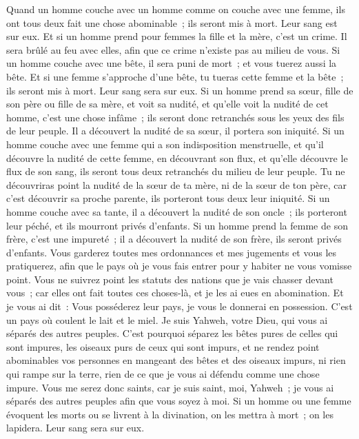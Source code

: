 \begin{multicols}{2}
Quand un homme couche avec un homme comme on couche avec une femme, ils ont tous deux fait une chose abominable~; ils seront mis à mort. Leur sang est sur eux.
Et si un homme prend pour femmes la fille et la mère, c'est un crime. Il sera brûlé au feu avec elles, afin que ce crime n'existe pas au milieu de vous.
Si un homme couche avec une bête, il sera puni de mort~; et vous tuerez aussi la bête.
Et si une femme s'approche d'une bête, tu tueras cette femme et la bête~; ils seront mis à mort. Leur sang sera sur eux.
Si un homme prend sa sœur, fille de son père ou fille de sa mère, et voit sa nudité, et qu'elle voit la nudité de cet homme, c'est une chose infâme~; ils seront donc retranchés sous les yeux des fils de leur peuple. Il a découvert la nudité de sa sœur, il portera son iniquité.
Si un homme couche avec une femme qui a son indisposition menstruelle, et qu'il découvre la nudité de cette femme, en découvrant son flux, et qu'elle découvre le flux de son sang, ils seront tous deux retranchés du milieu de leur peuple.
Tu ne découvriras point la nudité de la sœur de ta mère, ni de la sœur de ton père, car c'est découvrir sa proche parente, ils porteront tous deux leur iniquité.
Si un homme couche avec sa tante, il a découvert la nudité de son oncle~; ils porteront leur péché, et ils mourront privés d'enfants.
Si un homme prend la femme de son frère, c'est une impureté~; il a découvert la nudité de son frère, ils seront privés d'enfants.
Vous garderez toutes mes ordonnances et mes jugements et vous les pratiquerez, afin que le pays où je vous fais entrer pour y habiter ne vous vomisse point.
Vous ne suivrez point les statuts des nations que je vais chasser devant vous~; car elles ont fait toutes ces choses-là, et je les ai eues en abomination.
Et je vous ai dit~: Vous posséderez leur pays, je vous le donnerai en possession. C'est un pays où coulent le lait et le miel. Je suis Yahweh, votre Dieu, qui vous ai séparés des autres peuples.
C'est pourquoi séparez les bêtes pures de celles qui sont impures, les oiseaux purs de ceux qui sont impurs, et ne rendez point abominables vos personnes en mangeant des bêtes et des oiseaux impurs, ni rien qui rampe sur la terre, rien de ce que je vous ai défendu comme une chose impure.
Vous me serez donc saints, car je suis saint, moi, Yahweh~; je vous ai séparés des autres peuples afin que vous soyez à moi.
Si un homme ou une femme évoquent les morts ou se livrent à la divination, on les mettra à mort~; on les lapidera. Leur sang sera sur eux.

\end{multicols}
